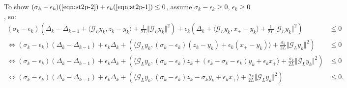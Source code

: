 \documentclass[12pt]{article}
\begin{document}
        To show $(\sigma_k - \epsilon_k)(\ref*{eqn:st2p-2}) + \epsilon_k(\ref*{eqn:st2p-1}) \le 0$, assume $\sigma_k - \epsilon_k \ge 0$, $\epsilon_k \ge 0$, so: 
        {\footnotesize
        \begin{align*}
            (\sigma_k - \epsilon_k)
            \left(
                \Delta_k - \Delta_{k - 1}
                + \langle \mathcal G_L y_k, z_k - y_k\rangle
                + \frac{1}{2L} \Vert \mathcal G_L y_k \Vert^2
            \right)
            + 
            \epsilon_k 
            \left(
                \Delta_k + \langle \mathcal G_L y_k, x_+ - y_k\rangle + \frac{1}{2L}\Vert \mathcal G_L y_k\Vert^2
            \right)
            &\le 
            0
            \\
            \iff
            (\sigma_k - \epsilon_k)(\Delta_k - \Delta_{k - 1}) 
            + \epsilon_k \Delta_k 
            + 
            \left(
                \langle \mathcal G_L y_k, 
                    (\sigma_k - \epsilon_k)(z_k - y_k)
                    + 
                    \epsilon_k (x_+ - y_k)
                \rangle
                + 
                \frac{\sigma_k}{2L}\Vert \mathcal G_Ly_k\Vert^2
            \right) 
            &\le 0
            \\
            \iff
            (\sigma_k - \epsilon_k)(\Delta_k - \Delta_{k - 1}) 
            + \epsilon_k \Delta_k 
            + 
            \left(
                \langle \mathcal 
                    G_L y_k, 
                    (\sigma_k - \epsilon_k)z_k + 
                    (\epsilon_k - \sigma_k - \epsilon_k)y_k
                    + 
                    \epsilon_k x_+
                \rangle
                + 
                \frac{\sigma_k}{2L}\Vert \mathcal G_Ly_k\Vert^2
            \right) 
            &\le 0
            \\
            \iff
            (\sigma_k - \epsilon_k)(\Delta_k - \Delta_{k - 1}) 
            + \epsilon_k \Delta_k 
            + 
            \left(
                \langle \mathcal 
                    G_L y_k, 
                    (\sigma_k - \epsilon_k)z_k - \sigma_k y_k + \epsilon_k x_+
                \rangle
                + 
                \frac{\sigma_k}{2L}\Vert \mathcal G_Ly_k\Vert^2
            \right) 
            &\le 0. 
        \end{align*}
        }

    
\end{document}
